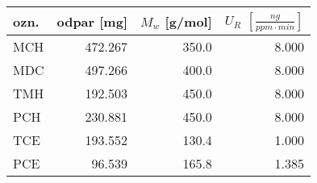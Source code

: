 \begin{tabular}{lrrr}
\toprule
ozn. &  odpar [mg] &    $M_w$ [g/mol] &    $U_R$ $\left[\frac{ng}{ppm\cdot min}\right]$\\
\midrule
MCH &  472.267 &  350.0 &  8.000 \\
MDC &  497.266 &  400.0 &  8.000 \\
TMH &  192.503 &  450.0 &  8.000 \\
PCH &  230.881 &  450.0 &  8.000 \\
TCE &  193.552 &  130.4 &  1.000 \\
PCE &   96.539 &  165.8 &  1.385 \\
\bottomrule
\end{tabular}
